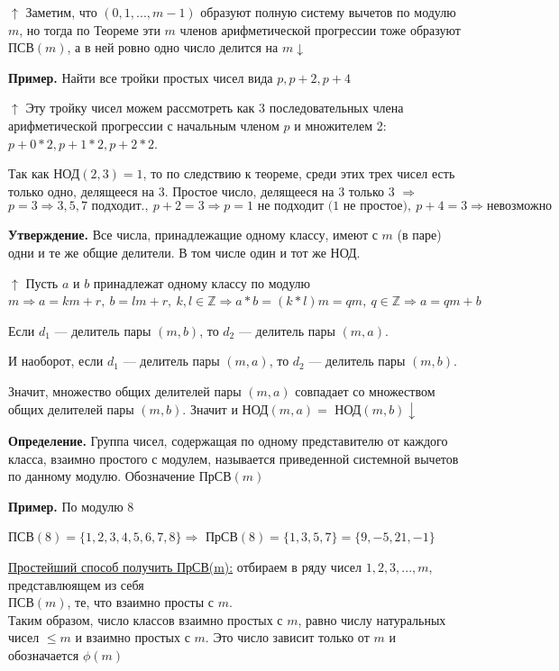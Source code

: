 \documentclass{article}
\begin{document}
            $\uparrow$ Заметим, что $(0,1,...,m - 1)$ образуют полную систему вычетов по модулю $m$, но тогда по Теореме эти $m$ членов арифметической прогрессии тоже образуют $\textrm{ПСВ}(m)$, а в ней ровно одно число делится на $m \downarrow$
            
            \textbf{Пример.} Найти все тройки простых чисел вида $p, p + 2, p + 4$
            
            $\uparrow$ Эту тройку чисел можем рассмотреть как 3 последовательных члена арифметической прогрессии с начальным членом $p$ и множителем 2: $p + 0*2, p + 1*2, p + 2*2$.
            
            Так как $\textrm{НОД}(2,3) = 1$, то по следствию к теореме, среди этих трех чисел есть только одно, делящееся на 3. Простое число, делящееся на 3 только 3 $\Rightarrow$
            \[ p = 3 \Rightarrow 3, 5, 7 \textrm{ подходит.},\ p + 2 = 3 \Rightarrow p = 1 \textrm{ не подходит (1 не простое)},\ p + 4 = 3 \Rightarrow \textrm{невозможно} \]
    		
            \textbf{Утверждение.} Все числа, принадлежащие одному классу, имеют с $m$ (в паре) одни и те же общие делители. В том числе один и тот же НОД.
            
            $\uparrow$ Пусть $a$ и $b$ принадлежат одному классу по модулю $m \Rightarrow a = km + r,\ b = lm + r,\ k,l \in \mathbb{Z} \Rightarrow a*b = (k*l)m = qm,\ q \in \mathbb{Z} \Rightarrow a = qm + b$  
            
            Если $d_1$ --- делитель пары $(m, b)$, то $d_2$ --- делитель пары $(m, a)$.
            
            И наоборот, если $d_1$ --- делитель пары $(m, a)$, то $d_2$ --- делитель пары $(m, b)$.
            
            Значит, множество общих делителей пары $(m, a)$ совпадает со множеством общих делителей пары $(m, b)$. Значит и НОД$(m, a) = $ НОД$(m, b) \downarrow$ 
            
            \textbf{Определение.} Группа чисел, содержащая по одному представителю от каждого класса, взаимно простого с модулем, называется приведенной системной вычетов по данному модулю. Обозначение ПрСВ$(m)$
            
            \textbf{Пример.} По модулю 8
            
            ПСВ$(8) = \{1, 2, 3, 4, 5, 6, 7, 8\} \Rightarrow$ ПрСВ$(8) = \{1,3,5,7\} = \{9, -5, 21, -1\}$
            
            \underline{Простейший способ получить ПрСВ(m):} отбираем в ряду чисел $1,2,3,...,m$, представлюящем из себя\\
            ПСВ$(m)$, те, что взаимно просты с $m$.\\
            Таким образом, число классов взаимно простых с $m$, равно числу натуральных чисел $\leq m$ и взаимно простых с $m$. Это число зависит только от $m$ и обозначается $\phi(m)$
        
\end{document}
